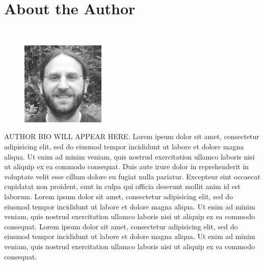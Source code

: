 \cleardoublepage
\chapter*{About the Author}

\hspace*{\fill}\\  
\par\begin{figure}\includegraphics[width=4cm]{AuthorPhoto}\end{figure}\noindent AUTHOR BIO WILL APPEAR HERE.  Lorem ipsum dolor sit amet, consectetur adipisicing elit, sed do eiusmod tempor incididunt ut labore et dolore magna aliqua. Ut enim ad minim veniam, quis nostrud exercitation ullamco laboris nisi ut aliquip ex ea commodo consequat. Duis aute irure dolor in reprehenderit in voluptate velit esse cillum dolore eu fugiat nulla pariatur. Excepteur sint occaecat cupidatat non proident, sunt in culpa qui officia deserunt mollit anim id est laborum. Lorem ipsum dolor sit amet, consectetur adipisicing elit, sed do eiusmod tempor incididunt ut labore et dolore magna aliqua. Ut enim ad minim veniam, quis nostrud exercitation ullamco laboris nisi ut aliquip ex ea commodo consequat. Lorem ipsum dolor sit amet, consectetur adipisicing elit, sed do eiusmod tempor incididunt ut labore et dolore magna aliqua. Ut enim ad minim veniam, quis nostrud exercitation ullamco laboris nisi ut aliquip ex ea commodo consequat. 
